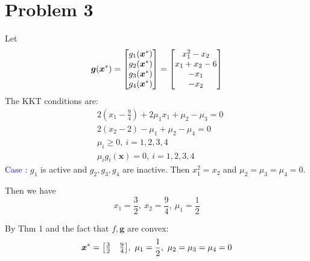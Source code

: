 \documentclass{article}
\def\bg{\boldsymbol{g}}
\def\bx{\boldsymbol{x}}
\def\case#1{\textcolor{blue}{Case \uppercase\expandafter{\romannumeral#1}: }}
\begin{document}
\newpage
\section*{Problem 3}
Let
\[
	\bg(\bx^*)
	=\mqty[g_1(\bx^*)\\g_2(\bx^*)\\g_3(\bx^*)\\g_4(\bx^*)]
	=\mqty[x_1^2-x_2 \\ x_1+x_2-6 \\ -x_1 \\ -x_2]
\]
The KKT conditions are:
\[
	\begin{aligned}
		&2(x_1-\frac{9}{4})+2\mu_1x_1+\mu_2-\mu_3=0
		\\&
		2(x_2-2)-\mu_1+\mu_2-\mu_4=0
		\\&
		\mu_i\ge0,\ i=1,2,3,4
		\\&
		\mu_ig_i(\bx)=0,\ i=1,2,3,4
	\end{aligned}
\]
\case{1}
$g_1$ is active and $g_2,g_3,g_4$ are inactive. Then $x_1^2=x_2$ and $\mu_2=\mu_3=\mu_4=0$.

Then we have 
\[
	x_1=\frac{3}{2},\ x_2=\frac{9}{4},\ 
	\mu_1=\frac{1}{2}
\]

By Thm 1 and the fact that $f,\bg$ are convex:
\[
	\bx^*=\mqty[\frac{3}{2} & \frac{9}{4}],\ 
	\mu_1=\frac{1}{2},\ 
	\mu_2=\mu_3=\mu_4=0
\]
\end{document}
